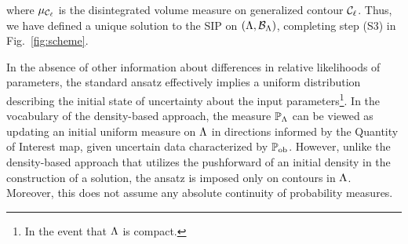 \noindent where $\mu_{\mathcal{C}_\ell}$ is the disintegrated volume measure on generalized contour $\mathcal{C}_\ell$.
Thus, we have defined a unique solution to the SIP on ${({\Lambda}, \mathcal{B}_{{\Lambda}})}$, completing step (S3) in Fig.~\ref{fig:scheme}.

In the absence of other information about differences in relative likelihoods of parameters, the standard ansatz effectively implies a uniform distribution describing the initial state of uncertainty about the input parameters\footnote{In the event that ${\Lambda}$ is compact.}.
In the vocabulary of the density-based approach, the measure $\mathbb{P}_{\Lambda}$ can be viewed as updating an initial uniform measure on ${\Lambda}$ in directions informed by the Quantity of Interest map, given uncertain data characterized by $\operatorname*{\mathbb{P}_{ob}}$.
However, unlike the density-based approach that utilizes the pushforward of an initial density in the construction of a solution, the ansatz is imposed only on contours in ${\Lambda}$.
Moreover, this does not assume any absolute continuity of probability measures.

\vfill
